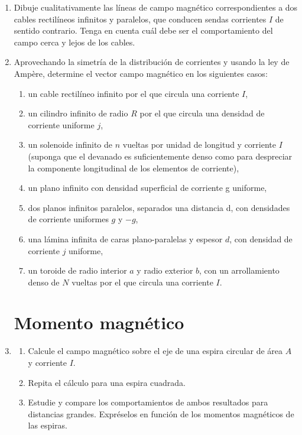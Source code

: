 \documentclass[11pt,spanish,a4paper]{article}
\begin{document}
\begin{enumerate}
  \item Dibuje cualitativamente las líneas de campo magnético correspondientes a dos cables rectilíneos infinitos y paralelos, que conducen sendas corrientes \(I\) de sentido contrario.
Tenga en cuenta cuál debe ser el comportamiento del campo cerca y lejos de los cables.


  \item Aprovechando la simetría de la distribución de corrientes y usando la ley de Ampère, determine el vector campo magnético en los siguientes casos:
\begin{enumerate}
\item un cable rectilíneo infinito por el que circula una corriente \(I\),
\item un cilindro infinito de radio \(R\) por el que circula una densidad de corriente uniforme \(j\),
\item un solenoide infinito de \(n\) vueltas por unidad de longitud y corriente \(I\) (suponga que el devanado es suficientemente denso como para despreciar la componente longitudinal de los elementos de corriente),
\item un plano infinito con densidad superficial de corriente g uniforme,
\item dos planos infinitos paralelos, separados una distancia d, con densidades de corriente uniformes \(g\) y \(-g\),
\item una lámina infinita de caras plano-paralelas y espesor \(d\), con densidad de corriente \(j\) uniforme,
\item un toroide de radio interior \(a\) y radio exterior \(b\), con un arrollamiento denso de \(N\) vueltas por el que circula una corriente \(I\).
\end{enumerate}


\section*{Momento magnético}

  \item \setlength{\parskip}{0cm}
  \begin{enumerate}
  \item Calcule el campo magnético sobre el eje de una espira circular de área \(A\) y corriente \(I\).
  \item Repita el cálculo para una espira cuadrada.
  \item  Estudie y compare los comportamientos de ambos resultados para distancias grandes.
Expréselos en función de los momentos magnéticos de las espiras. 
\end{enumerate}



\end{enumerate}
\end{document}
